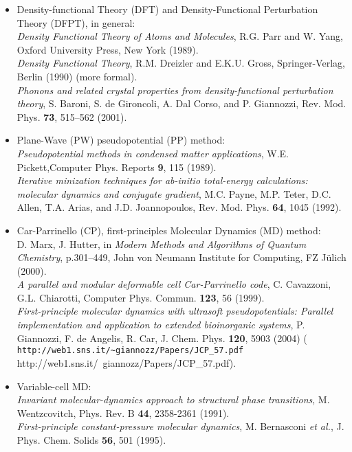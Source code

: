 \documentclass[12pt,a4paper]{article}
\begin{document}
\begin{itemize}
\item Density-functional Theory (DFT) and Density-Functional Perturbation
Theory (DFPT), in general: 
\medskip \\
\emph{Density Functional Theory of Atoms and Molecules}, 
R.G. Parr and W. Yang,
Oxford University Press, New York (1989).\\
\emph{Density Functional Theory},
R.M. Dreizler and E.K.U. Gross,
Springer-Verlag, Berlin (1990) (more formal).\\
\emph{Phonons and related crystal properties from density-functional
  perturbation theory},
S. Baroni, S. de Gironcoli, A. Dal Corso, and P. Giannozzi,
Rev. Mod. Phys. \textbf{73}, 515--562 (2001).

\item Plane-Wave (PW) pseudopotential (PP) method:
\medskip \\
  \emph{Pseudopotential methods in condensed matter applications},
  W.E. Pickett,Computer Phys. Reports \textbf{9}, 115 (1989).\\
  \emph{Iterative minization techniques for ab-initio total-energy 
    calculations: molecular dynamics and conjugate gradient},
  M.C. Payne, M.P. Teter, D.C. Allen, T.A. Arias, and J.D. Joannopoulos,
  Rev. Mod. Phys. \textbf{64}, 1045 (1992).

\item Car-Parrinello (CP), first-principles Molecular Dynamics (MD) method:
\medskip \\
  D. Marx, J. Hutter,
  in \emph{Modern Methods and Algorithms of Quantum Chemistry},
  p.301--449,
  John von Neumann Institute for Computing, FZ J\"ulich (2000).\\
  \emph{A parallel and modular deformable cell Car-Parrinello code},
  C. Cavazzoni, G.L. Chiarotti,
  Computer Phys. Commun. \textbf{123}, 56 (1999). \\
  \emph{First-principle molecular dynamics with ultrasoft pseudopotentials:
  Parallel implementation and application to extended bioinorganic systems},
  P. Giannozzi, F. de Angelis, R. Car, J. Chem. Phys. \textbf{120}, 5903 (2004)
  (\htmladdnormallink%
  {\texttt{http://web1.sns.it/\~{}giannozz/Papers/JCP\_57.pdf}}%
  {http://web1.sns.it/~giannozz/Papers/JCP_57.pdf}).

\item Variable-cell MD: 
\medskip \\
  \emph{Invariant molecular-dynamics approach to structural phase
    transitions}, M. Wentzcovitch, Phys. Rev. B \textbf{44}, 2358-2361 
  (1991).\\
   \emph{First-principle constant-pressure molecular dynamics},
   M. Bernasconi \emph{et al.}, J. Phys. Chem. Solids \textbf{56}, 501 (1995).


\end{itemize}
\end{document}
